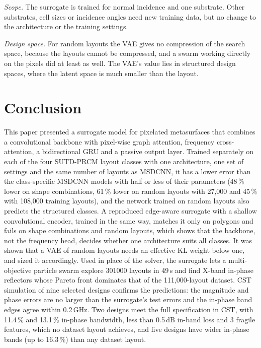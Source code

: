 \documentclass[journal]{IEEEtran}
\begin{document}
\emph{Scope.} The surrogate is trained for normal incidence and one substrate. Other substrates, cell sizes or incidence angles need new training data, but no change to the architecture or the training settings.

\emph{Design space.} For random layouts the VAE gives no compression of the search space, because the layouts cannot be compressed, and a swarm working directly on the pixels did at least as well. The VAE's value lies in structured design spaces, where the latent space is much smaller than the layout.

\section{Conclusion}
This paper presented a surrogate model for pixelated metasurfaces that combines a convolutional backbone with pixel-wise graph attention, frequency cross-attention, a bidirectional GRU and a passive output layer. Trained separately on each of the four SUTD-PRCM layout classes with one architecture, one set of settings and the same number of layouts as MSDCNN, it has a lower error than the class-specific MSDCNN models with half or less of their parameters (48\,\% lower on shape combinations, 61\,\% lower on random layouts with 27,000 and 45\,\% with 108,000 training layouts), and the network trained on random layouts also predicts the structured classes. A reproduced edge-aware surrogate with a shallow convolutional encoder, trained in the same way, matches it only on polygons and fails on shape combinations and random layouts, which shows that the backbone, not the frequency head, decides whether one architecture suits all classes. It was shown that a VAE of random layouts needs an effective KL weight below one, and sized it accordingly. Used in place of the solver, the surrogate lets a multi-objective particle swarm explore \num{301000} layouts in 49\,s and find X-band in-phase reflectors whose Pareto front dominates that of the 111,000-layout dataset. CST simulation of nine selected designs confirms the predictions: the magnitude and phase errors are no larger than the surrogate's test errors and the in-phase band edges agree within 0.2\,GHz. Two designs meet the full specification in CST, with 11.4\,\% and 13.1\,\% in-phase bandwidth, less than 0.5\,dB in-band loss and 3 fragile features, which no dataset layout achieves, and five designs have wider in-phase bands (up to 16.3\,\%) than any dataset layout.
\end{document}
